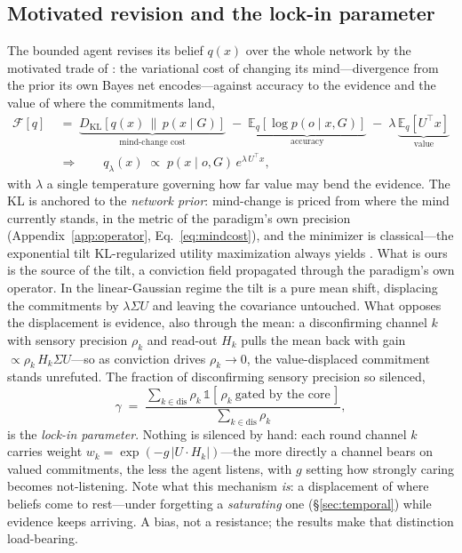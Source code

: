 \documentclass[runningheads]{llncs}
\newcommand{\KL}[2]{D_{\mathrm{KL}}\!\left[#1\,\middle\|\,#2\right]}
\newcommand{\Eq}[2]{\mathbb{E}_{#1}\!\left[#2\right]}
\begin{document}
\subsection{Motivated revision and the lock-in parameter}
\label{sec:revision}

The bounded agent revises its belief $q(x)$ over the whole network by the motivated trade of
\citet{hyland2025}: the variational cost of changing its mind---divergence from the prior its own
Bayes net encodes---against accuracy to the evidence and the value of where the commitments land,
\begin{equation}
\begin{aligned}
\mathcal{F}[q]\;&=\;
\underbrace{\KL{q(x)}{p(x\mid G)}}_{\text{mind-change cost}}
\;-\;\underbrace{\Eq{q}{\log p(o\mid x,G)}}_{\text{accuracy}}
\;-\;\lambda\,\underbrace{\Eq{q}{U^{\!\top}\!x}}_{\text{value}}\\[2pt]
&\Longrightarrow\qquad
q_\lambda(x)\;\propto\;p(x\mid o,G)\,e^{\lambda\,U^{\!\top}\!x},
\end{aligned}
\label{eq:tilted}
\end{equation}
with $\lambda$ a single temperature governing how far value may bend the evidence. The KL is
anchored to the \emph{network prior}: mind-change is priced from where the mind currently
stands, in the metric of the paradigm's own precision (Appendix~\ref{app:operator},
Eq.~\ref{eq:mindcost}), and the minimizer is classical---the exponential tilt KL-regularized
utility maximization always yields \citep{todorov2009,ortega2013}. What is ours is the source
of the tilt, a conviction field propagated through the paradigm's own operator. In the
linear-Gaussian regime the tilt is a pure mean shift, displacing the commitments by
$\lambda\Sigma U$ and leaving the covariance untouched. What opposes the displacement is
evidence, also through the mean: a disconfirming channel $k$ with sensory precision $\rho_k$
and read-out $H_k$ pulls the mean back with gain $\propto\rho_k\,H_k\Sigma U$---so as
conviction drives $\rho_k\to0$, the value-displaced commitment stands unrefuted. The fraction
of disconfirming sensory precision so silenced,
\begin{equation}
\gamma\;=\;\frac{\sum_{k\in\mathrm{dis}}\rho_k\,\mathbb{1}[\,\rho_k\ \text{gated by the core}\,]}
{\sum_{k\in\mathrm{dis}}\rho_k},
\label{eq:gamma}
\end{equation}
is the \emph{lock-in parameter}. Nothing is silenced by hand: each round channel $k$ carries
weight $w_k=\exp(-g\,|U\!\cdot\!H_k|)$---the more directly a channel bears on valued
commitments, the less the agent listens, with $g$ setting how strongly caring becomes
not-listening. Note what this mechanism \emph{is}: a displacement of where beliefs come to
rest---under forgetting a \emph{saturating} one (\S\ref{sec:temporal}) while evidence keeps
arriving. A bias, not a resistance; the results make that distinction load-bearing.
\end{document}

